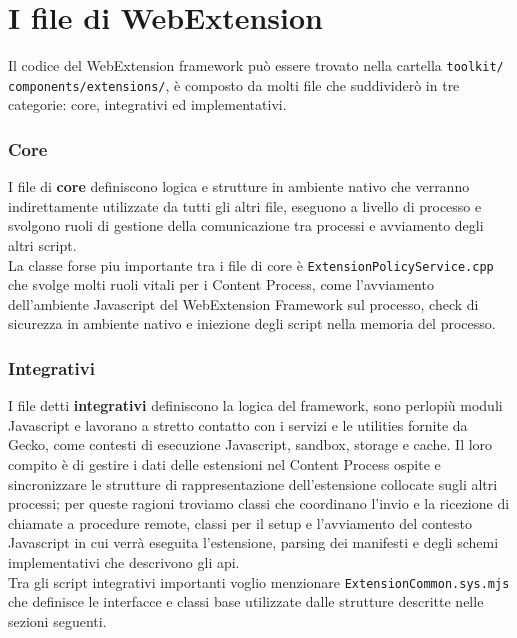 \documentclass{sapthesis}
\newcommand{\bold}[1]{\textbf{#1}}
\newcommand{\code}[1]{\texttt{#1}}
\newcommand{\file}[1]{\code{#1}}
\newcommand{\JS}{Javascript}
\begin{document}
    \section{I file di WebExtension}
    \label{sec:webextension-files}
        Il codice del WebExtension framework può essere trovato nella cartella \file{toolkit/} \file{components/extensions/}, è composto
        da molti file che suddividerò in tre categorie: core, integrativi ed implementativi.\\
        \subsubsection{Core}
        I file di \bold{core} definiscono logica e strutture in ambiente nativo che verranno indirettamente utilizzate da
        tutti gli altri file, eseguono a livello di processo e svolgono ruoli di gestione della comunicazione tra
        processi e avviamento degli altri script.\\
        La classe forse piu importante tra i file di core è \file{ExtensionPolicyService.cpp} che svolge molti ruoli
        vitali per i Content Process, come l'avviamento dell'ambiente \JS{} del WebExtension Framework sul processo,
        check di sicurezza in ambiente nativo e iniezione degli script nella memoria del processo.\\
        \subsubsection{Integrativi}
        I file detti \bold{integrativi} definiscono la logica del framework, sono perlopiù moduli \JS{}
        e lavorano a stretto contatto con i servizi e le utilities fornite da Gecko, come contesti di esecuzione \JS{}, sandbox, storage
        e cache. Il loro compito è di gestire i dati delle estensioni nel Content Process ospite e sincronizzare le strutture
        di rappresentazione dell'estensione collocate sugli altri processi; per queste ragioni troviamo classi che
        coordinano l'invio e la ricezione di chiamate a procedure remote, classi per il setup e l'avviamento
        del contesto \JS{} in cui verrà eseguita l'estensione, parsing dei manifesti e degli schemi implementativi
        che descrivono gli api. \\
        Tra gli script integrativi importanti voglio menzionare \file{ExtensionCommon.sys.mjs}
        che definisce le interfacce e classi base utilizzate dalle strutture descritte nelle sezioni seguenti.\\
\end{document}

